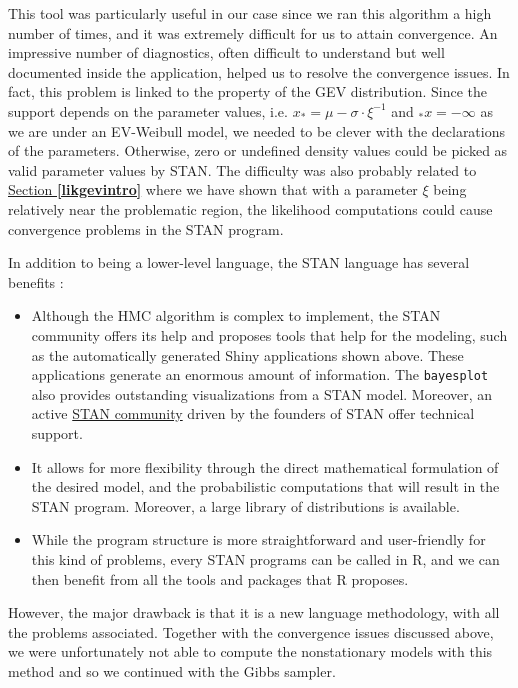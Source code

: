 This tool was particularly useful in our case since we ran this algorithm a high number of times, and it was extremely difficult for us to attain convergence. 
An impressive number of diagnostics, often difficult to understand but well documented inside the application, helped us to resolve the convergence issues. In fact, this problem is linked to the property of the GEV distribution. Since the support depends on the parameter values, i.e. $x_*=\mu-\sigma\cdot\xi^{-1}$ and $_*x=-\infty$ as we are under an EV-Weibull model, we needed to be clever with the declarations of the parameters. Otherwise, zero or undefined density values could be picked as valid parameter values by STAN. The difficulty was also probably related to \hyperref[likgevintro]{Section \textbf{\ref{likgevintro}}} where we have shown that with a parameter $\xi$ being relatively near the problematic region, the likelihood computations could cause convergence problems in the STAN program. 


 In addition to being a lower-level language, the STAN language has several benefits : 
 
 \begin{itemize}
 	\item  Although the HMC algorithm is complex to implement, the STAN community offers its help and proposes tools that help for the modeling, such as the automatically generated Shiny applications shown above. These applications generate an enormous amount of information. The \texttt{bayesplot} also provides outstanding visualizations from a STAN model. Moreover, an active 		 \href{https://groups.google.com/forum/#!forum/stan-users}{STAN community} driven by the founders of STAN offer technical support.
 	
 	\item It allows for more flexibility through the direct mathematical formulation of the desired model, and the probabilistic computations that will result in the STAN program. Moreover, a large library
 	of distributions is available.
 	
 	\item While the program structure is more straightforward and user-friendly for this kind of problems, every STAN programs can be called in R, and we can then benefit from all the tools and packages that R proposes.
 \end{itemize}
However, the major drawback is that it is a new language methodology, with all the problems associated. Together with the convergence issues discussed above, we were unfortunately not able to compute the nonstationary models with this method and so we continued with the Gibbs sampler.


